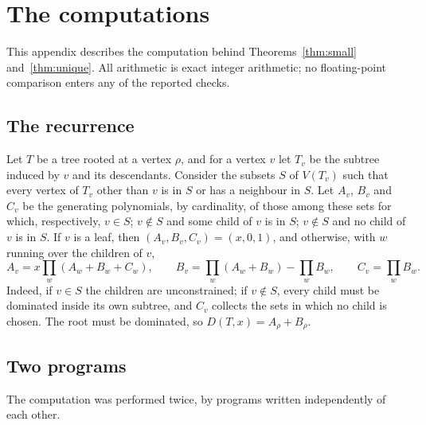 \section{The computations}\label{app:computation}

This appendix describes the computation behind Theorems~\ref{thm:small}
and~\ref{thm:unique}. All
arithmetic is exact integer arithmetic; no floating-point comparison enters
any of the reported checks.

\subsection*{The recurrence}
Let $T$ be a tree rooted at a vertex $\rho$, and for a vertex $v$ let $T_v$
be the subtree induced by $v$ and its descendants. Consider the subsets $S$
of $V(T_v)$ such that every vertex of $T_v$ other than $v$ is in $S$ or has a
neighbour in $S$. Let $A_v$, $B_v$ and $C_v$ be the generating polynomials, by
cardinality, of those among these sets for which, respectively, $v\in S$;
$v\notin S$ and some child of $v$ is in $S$; $v\notin S$ and no child of $v$
is in $S$. If $v$ is a leaf, then $(A_v,B_v,C_v)=(x,0,1)$, and otherwise,
with $w$ running over the children of $v$,
\begin{equation}\label{eq:dp}
  A_v=x\prod_w(A_w+B_w+C_w),\qquad
  B_v=\prod_w(A_w+B_w)-\prod_w B_w,\qquad
  C_v=\prod_w B_w .
\end{equation}
Indeed, if $v\in S$ the children are unconstrained; if $v\notin S$, every
child must be dominated inside its own subtree, and $C_v$ collects the sets in
which no child is chosen. The root must be dominated, so
$D(T,x)=A_\rho+B_\rho$.

\subsection*{Two programs}
The computation was performed twice, by programs written independently of
each other.

